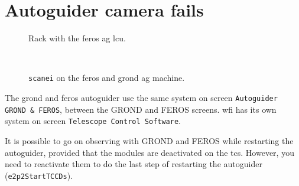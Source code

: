 \documentclass[11pt,fleqn]{book} %
\begin{document}
\section{Autoguider camera fails}
\label{sec:agfail}

\begin{figure}[p!]
\hfill
{}\hfill
{}
\caption[Rack with FEROS AG LCU]{Rack with the \gls{feros} \gls{ag} \gls{lcu}.}
\label{fig:l2p2cam}
\end{figure}

\begin{figure}[p!]
\begin{minipage}{0.48\linewidth}
\\
\end{minipage}
\hspace{0.02\linewidth}
\begin{minipage}{0.48\linewidth}
\end{minipage}
\caption[Command scanei to control environments]{\texttt{scanei} on the \gls{feros} and \gls{grond} 
\gls{ag} machine.}
\label{fig:agscanei}
\end{figure}


The \gls{grond} and \gls{feros} autoguider use the same system on screen \texttt{Autoguider GROND \& FEROS}, between the GROND and FEROS screens.  \gls{wfi} has its own system on screen \texttt{Telescope Control Software}.

It is possible to go on observing with GROND and FEROS while restarting the autoguider, provided that the modules are deactivated on the \gls{tcs}. However, you need to reactivate them to do the last step of restarting the autoguider (\texttt{e2p2StartTCCDs}).
\end{document}
